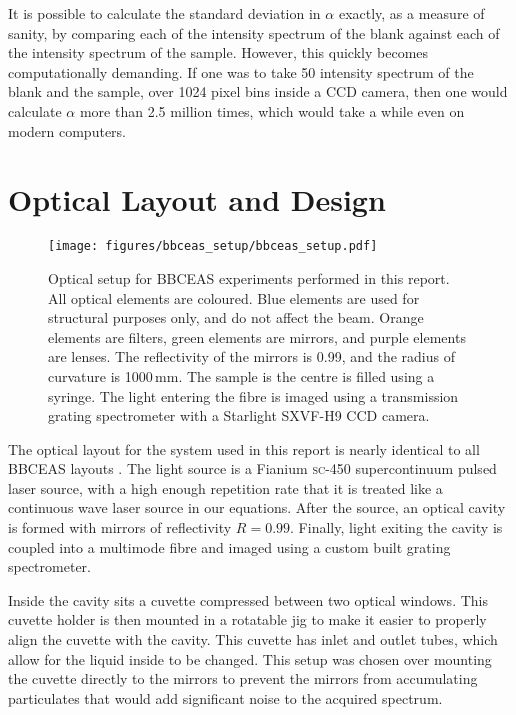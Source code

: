 It is possible to calculate the standard deviation in $\alpha$ exactly, as a
measure of sanity, by comparing each of the intensity spectrum of the
blank against each of the intensity spectrum of the sample. However, this
quickly becomes computationally demanding. If one was to take 50
intensity spectrum of the blank and the sample, over 1024 pixel bins inside a
CCD camera, then one would calculate $\alpha$ more than 2.5 million times,
which would take a while even on modern computers.



\section{Optical Layout and Design}\label{sec:optical_layout}

\begin{wide}
\begin{figure}
\begin{center}
\texttt{[image: figures/bbceas\_setup/bbceas\_setup.pdf]}
\end{center}
\caption{Optical setup for \ac{BBCEAS} experiments performed in this report. All optical elements are coloured. Blue elements are used for structural purposes only, and do not affect the beam. Orange elements are filters, green elements are mirrors, and purple elements are lenses. The reflectivity of the mirrors is 0.99, and the radius of curvature is 1000\,mm. The sample is the centre is filled using a syringe. The light entering the fibre is imaged using a transmission grating spectrometer with a Starlight SXVF-H9 \ac{CCD} camera.}
\label{fig:optical_layout}
\end{figure}
\end{wide}


The optical layout for the system used in this report is nearly identical to
all \ac{BBCEAS} layouts \cite{Berden:2009wk}. The light source is a Fianium
\textsc{sc-450} supercontinuum pulsed laser source, with a high enough
repetition rate that it is treated like a continuous wave laser source in our
equations. After the source, an optical cavity is formed with mirrors of
reflectivity $R=0.99$. Finally, light exiting the cavity is coupled into a
multimode fibre and imaged using a custom built grating spectrometer.

Inside the cavity sits a cuvette compressed between two optical windows. This
cuvette holder is then mounted in a rotatable jig to make it easier to properly
align the cuvette with the cavity. This cuvette has inlet and outlet tubes,
which allow for the liquid inside to be changed. This setup was chosen over
mounting the cuvette directly to the mirrors \cite{Seetohul:2009ij} to prevent
the mirrors from accumulating particulates that would add significant noise to
the acquired spectrum.



